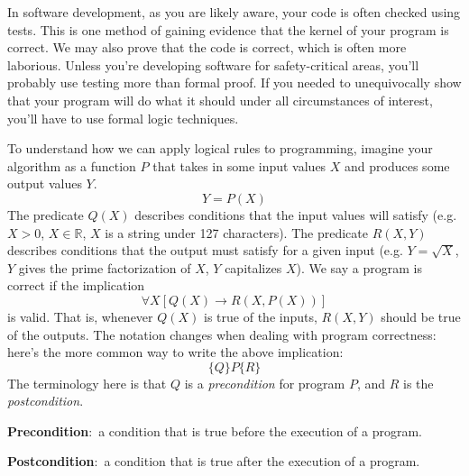 \documentclass[nobib]{tufte-handout}
\newcommand{\defn}[2]{\noindent\textbf{#1}:\ #2}
\begin{document}
In software development, as you are likely aware, your code is often checked 
using tests. This is one method of gaining evidence that the kernel of your 
program is correct. 
We may also prove that the code is correct, which is 
often more laborious. Unless you're developing software for safety-critical 
areas, you'll probably use testing more than formal proof. If you needed 
to unequivocally show that your program will do what it 
should under all circumstances of interest, you'll have to use formal 
logic techniques. 

To understand how we can apply logical rules to programming, imagine 
your algorithm as a function $P$ that takes in some input values $X$
and produces some output values $Y$. 
\[Y = P(X)\]
The predicate $Q(X)$ describes conditions that the input values 
will satisfy (e.g. $X > 0$, $X \in \mathbb{R}$, $X$ is a string under 127
characters). The predicate $R(X,Y)$ describes conditions that the output must satisfy
for a given input (e.g. $Y = \sqrt{X}$, $Y$ gives the prime factorization of $X$, 
$Y$ capitalizes $X$). We say a program is correct if the implication
\[\forall X[Q(X) \rightarrow R(X,P(X))]\]
is valid. That is, whenever $Q(X)$ is true of the inputs, $R(X,Y)$ should 
be true of the outputs. The notation changes when dealing with 
program correctness: here's the more common way to write the above implication:
\[\{Q\}P\{R\}\]
The terminology here is that $Q$ is a \emph{precondition} for program $P$, 
and $R$ is the \emph{postcondition}.

\defn{Precondition}{a condition that is true before the execution of a program}.

\defn{Postcondition}{a condition that is true after the execution of a program}.
\end{document}
